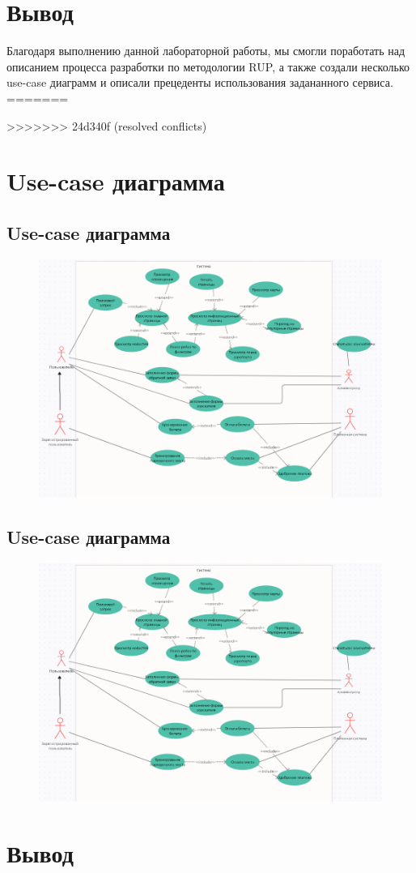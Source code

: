 \documentclass{article}
\begin{document}
\section{Вывод}
Благодаря выполнению данной лабораторной работы, 
мы смогли поработать над описанием процесса разработки 
по методологии RUP, а также создали несколько use-case 
диаграмм и описали прецеденты использования задананного
сервиса. 
=======

>>>>>>> 24d340f (resolved conflicts)

\newpage
\section{Use-case диаграмма}

\subsection{Use-case диаграмма}
\begin{figure}[h]
  \includegraphics[width=\textwidth]{use-case-diagram/Use-case.png}
  \centering
\end{figure}
\subsection{Use-case диаграмма}
\begin{figure}[h]
  \includegraphics[width=\textwidth]{use-case-diagram/Use-case.png}
  \centering
\end{figure}

\section{Вывод}


\end{document}
